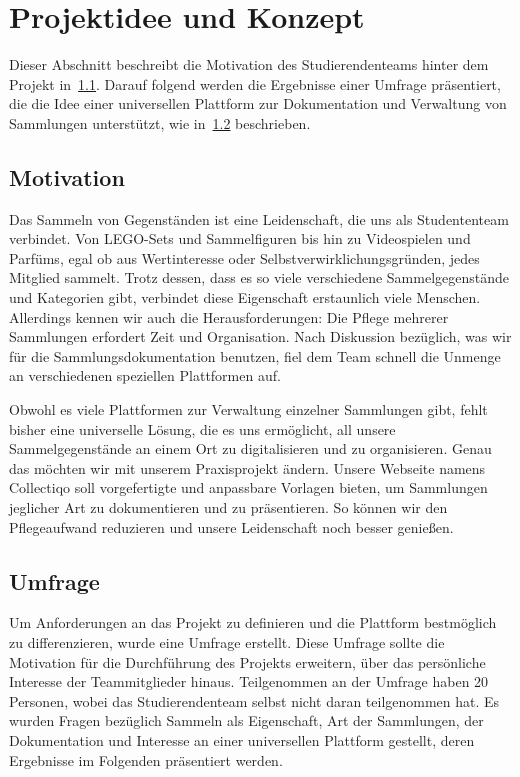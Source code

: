 \section{Projektidee und Konzept}\label{sec:projektidee-und-konzept}

Dieser Abschnitt beschreibt die Motivation des Studierendenteams hinter dem Projekt in~\ref{subsec:motivation}.
Darauf folgend werden die Ergebnisse einer Umfrage präsentiert, die die Idee einer universellen Plattform zur Dokumentation und Verwaltung von Sammlungen unterstützt, wie in~\ref{subsec:umfrage} beschrieben.

\subsection{Motivation}\label{subsec:motivation}


Das Sammeln von Gegenständen ist eine Leidenschaft, die uns als Studententeam verbindet.
Von LEGO-Sets und Sammelfiguren bis hin zu Videospielen und Parfüms, egal ob aus Wertinteresse oder Selbstverwirklichungsgründen, jedes Mitglied sammelt.
Trotz dessen, dass es so viele verschiedene Sammelgegenstände und Kategorien gibt, verbindet diese Eigenschaft erstaunlich viele Menschen.
Allerdings kennen wir auch die Herausforderungen: Die Pflege mehrerer Sammlungen erfordert Zeit und Organisation.
Nach Diskussion bezüglich, was wir für die Sammlungsdokumentation benutzen, fiel dem Team schnell die Unmenge an verschiedenen speziellen Plattformen auf. \par
Obwohl es viele Plattformen zur Verwaltung einzelner Sammlungen gibt, fehlt bisher eine universelle Lösung, die es uns ermöglicht, all unsere Sammelgegenstände an einem Ort zu digitalisieren und zu organisieren.
Genau das möchten wir mit unserem Praxisprojekt ändern.
Unsere Webseite namens Collectiqo soll vorgefertigte und anpassbare Vorlagen bieten, um Sammlungen jeglicher Art zu dokumentieren und zu präsentieren.
So können wir den Pflegeaufwand reduzieren und unsere Leidenschaft noch besser genießen.


\subsection{Umfrage}\label{subsec:umfrage}

Um Anforderungen an das Projekt zu definieren und die Plattform bestmöglich zu differenzieren, wurde eine Umfrage erstellt.
Diese Umfrage sollte die Motivation für die Durchführung des Projekts erweitern, über das persönliche Interesse der Teammitglieder hinaus.
Teilgenommen an der Umfrage haben 20 Personen, wobei das Studierendenteam selbst nicht daran teilgenommen hat.
Es wurden Fragen bezüglich Sammeln als Eigenschaft, Art der Sammlungen, der Dokumentation und Interesse an einer universellen Plattform gestellt, deren Ergebnisse im Folgenden präsentiert werden.

